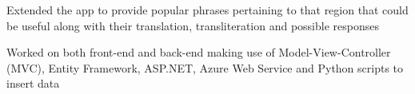 \begin{cventries}
{\begin{cvitems}
    \item {Extended the app to provide popular phrases pertaining to that region that could be useful along with their translation, transliteration and possible responses}
    \item {Worked on both front-end and back-end making use of Model-View-Controller (MVC), Entity Framework, ASP.NET, Azure Web Service and Python scripts to insert data}
  \end{cvitems}
  }
\end{cventries}
  